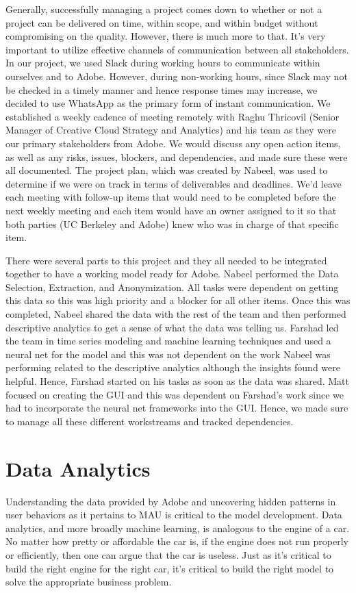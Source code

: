 \documentclass[11pt, oneside, authoryear]{report}
\begin{document}
Generally, successfully managing a project comes down to whether or not a project can be delivered on time, within scope, and within budget without compromising on the quality. However, there is much more to that. It's very important to utilize effective channels of communication between all stakeholders. In our project, we used Slack during working hours to communicate within ourselves and to Adobe. However, during non-working hours, since Slack may not be checked in a timely manner and hence response times may increase, we decided to use WhatsApp as the primary form of instant communication. We established a weekly cadence of meeting remotely with Raghu Thricovil (Senior Manager of Creative Cloud Strategy and Analytics) and his team as they were our primary stakeholders from Adobe. We would discuss any open action items, as well as any risks, issues, blockers, and dependencies, and made sure these were all documented. The project plan, which was created by Nabeel, was used to determine if we were on track in terms of deliverables and deadlines. We'd leave each meeting with follow-up items that would need to be completed before the next weekly meeting and each item would have an owner assigned to it so that both parties (UC Berkeley and Adobe) knew who was in charge of that specific item.

There were several parts to this project and they all needed to be integrated together to have a working model ready for Adobe. Nabeel performed the Data Selection, Extraction, and Anonymization. All tasks were dependent on getting this data so this was high priority and a blocker for all other items. Once this was completed, Nabeel shared the data with the rest of the team and then performed descriptive analytics to get a sense of what the data was telling us. Farshad led the team in time series modeling and machine learning techniques and used a neural net for the model and this was not dependent on the work Nabeel was performing related to the descriptive analytics although the insights found were helpful. Hence, Farshad started on his tasks as soon as the data was shared. Matt focused on creating the GUI and this was dependent on Farshad's work since we had to incorporate the neural net frameworks into the GUI. Hence, we made sure to manage all these different workstreams and tracked dependencies.

\section{Data Analytics}
Understanding the data provided by Adobe and uncovering hidden patterns in user behaviors as it pertains to MAU is critical to the model development. Data analytics, and more broadly machine learning, is analogous to the engine of a car.  No matter how pretty or affordable the car is, if the engine does not run properly or efficiently, then one can argue that the car is useless.  Just as it's critical to build the right engine for the right car, it's critical to build the right model to solve the appropriate business problem.
\end{document}
